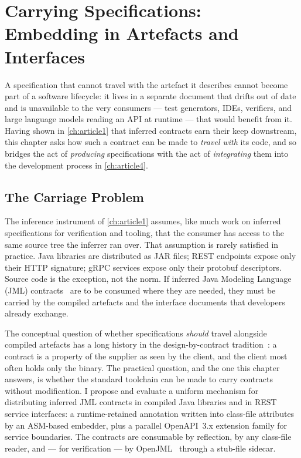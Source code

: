 \chapter{Carrying Specifications: Embedding in Artefacts and Interfaces}\label{ch:article2}

A specification that cannot travel with the artefact it describes cannot become
part of a software lifecycle: it lives in a separate document that drifts out of
date and is unavailable to the very consumers --- test generators, IDEs,
verifiers, and large language models reading an API at runtime --- that would
benefit from it. Having shown in \cref{ch:article1} that inferred contracts earn
their keep downstream, this chapter asks how such a contract can be made to
\emph{travel with} its code, and so bridges the act of \emph{producing}
specifications with the act of \emph{integrating} them into the development
process in \cref{ch:article4}.

\section{The Carriage Problem}
\label{sec:a2-intro}

The inference instrument of \cref{ch:article1} assumes, like much work on
inferred specifications for verification and tooling, that the consumer has
access to the same source tree the inferrer ran over. That assumption is rarely
satisfied in practice. Java libraries are distributed as JAR files; REST
endpoints expose only their HTTP signature; gRPC services expose only their
protobuf descriptors. Source code is the exception, not the norm. If inferred
Java Modeling Language (JML) contracts~\cite{leavens2006jml} are to be consumed
where they are needed, they must be carried by the compiled artefacts and the
interface documents that developers already exchange.

The conceptual question of whether specifications \emph{should} travel alongside
compiled artefacts has a long history in the design-by-contract
tradition~\cite{meyer1992dbc}: a contract is a property of the supplier as seen
by the client, and the client most often holds only the binary. The practical
question, and the one this chapter answers, is whether the standard toolchain
can be made to carry contracts without modification. I propose and evaluate a
uniform mechanism for distributing inferred JML contracts in compiled Java
libraries and in REST service interfaces: a runtime-retained annotation written
into class-file attributes by an ASM-based embedder, plus a parallel
OpenAPI~3.x extension family for service boundaries. The contracts are
consumable by reflection, by any class-file reader, and --- for verification ---
by OpenJML~\cite{cok2014openjml} through a stub-file sidecar.

